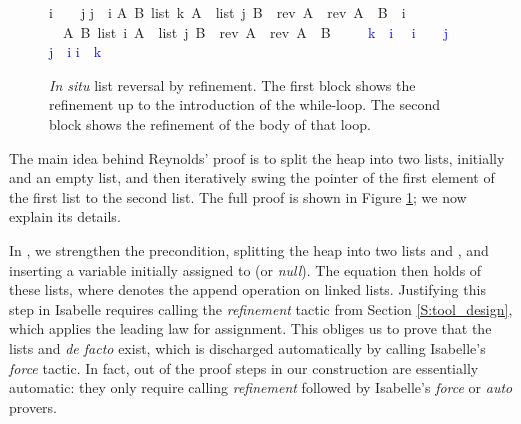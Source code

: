 \documentclass[twoside,runningheads,envcountsame,envcountsect,oribibl,orivec]{llncs}
\begin{document}
\begin{figure}
\begin{isabellebody}
{\isacharat}{\isacharparenleft}{\isacharbackquote}i\ {\isacharplus}\ {}{\isacharparenright}\ {\isacharcolon}{\isacharequal}\ {\isacharbackquote}j{\isacharsemicolon}\isanewline
{\isacharbackquote}j\ {\isacharcolon}{\isacharequal}\ {\isacharbackquote}i{\isacharsemicolon}\isanewline
{\isasymlbrakk}{\isacharparenleft}A\ B{\isachardot}\ {\isacharparenleft}list\ {\isacharbackquote}k\ A\ {\isacharasterisk}\ list\ {\isacharbackquote}j\ B{\isacharparenright}\ \ {\isacharparenleft}rev\ A{\isacharparenright}\ {\isacharequal}\ {\isacharparenleft}rev\ A{\isacharparenright}\ {\isacharat}\ B{\isacharparenright}\ \ {\isacharbackquote}i\ {\isasymnoteq}\ {}{\isacharcomma}\ \isanewline
\ \ A\ B{\isachardot}\ {\isacharparenleft}list\ {\isacharbackquote}i\ A\ {\isacharasterisk}\ list\ {\isacharbackquote}j\ B{\isacharparenright}\ \ {\isacharparenleft}rev\ A{\isacharparenright}\ {\isacharequal}\ {\isacharparenleft}rev\ A{\isacharparenright}\ {\isacharat}\ B\ {\isasymrbrakk}
\isanewline\ \ \ {\isasymsqsubseteq}\hfill \isanewline
\textcolor{blue}{{\isacharbackquote}k\ {\isacharcolon}{\isacharequal}\ {\isacharat}{\isacharparenleft}{\isacharbackquote}i\ {\isacharplus}\ {}{\isacharparenright}{\isacharsemicolon}\isanewline
{\isacharat}{\isacharparenleft}{\isacharbackquote}i\ {\isacharplus}\ {}{\isacharparenright}\ {\isacharcolon}{\isacharequal}\ {\isacharbackquote}j{\isacharsemicolon}\isanewline
{\isacharbackquote}j\ {\isacharcolon}{\isacharequal}\ {\isacharbackquote}i{\isacharsemicolon}\isanewline
{\isacharbackquote}i\ {\isacharcolon}{\isacharequal}\ {\isacharbackquote}k}
\end{isabellebody}
\caption{\emph{In situ} list reversal by refinement. The first block
shows the refinement up to the introduction of the while-loop. The
second block shows the refinement of the body of that loop.}
\label{fig:ref-reversal}
\end{figure}

The main idea behind Reynolds' proof is to split the heap into two
lists, initially  and an empty list, and then iteratively swing
the pointer of the first element of the first list to the second list.
The full proof is shown in Figure \ref{fig:ref-reversal}; we now
explain its details.

In , we strengthen the precondition, splitting the heap into two
lists  and , and inserting a variable  initially assigned to
 (or \emph{null}). The equation  then
holds of these lists, where  denotes the append operation on linked
lists. Justifying this step in Isabelle requires calling the
\emph{refinement} tactic from Section \ref{S:tool_design}, which
applies the leading law for assignment. This obliges us to prove that
the lists  and  \emph{de facto} exist, which is discharged
automatically by calling Isabelle's \emph{force} tactic.  In fact, 
out of the  proof steps in our construction are essentially
automatic: they only require calling \emph{refinement} followed by
Isabelle's \emph{force} or \emph{auto} provers.
\end{document}
